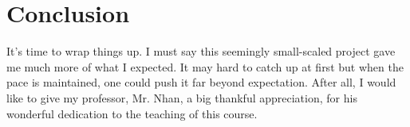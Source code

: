 \section{Conclusion}
It's time to wrap things up. I must say this seemingly small-scaled project gave me much more of what I expected. It may hard to catch up at first but when the pace is maintained, one could push it far beyond expectation. After all, I would like to give my professor, Mr. Nhan, a big thankful appreciation, for his wonderful dedication to the teaching of this course. 
\clearpage